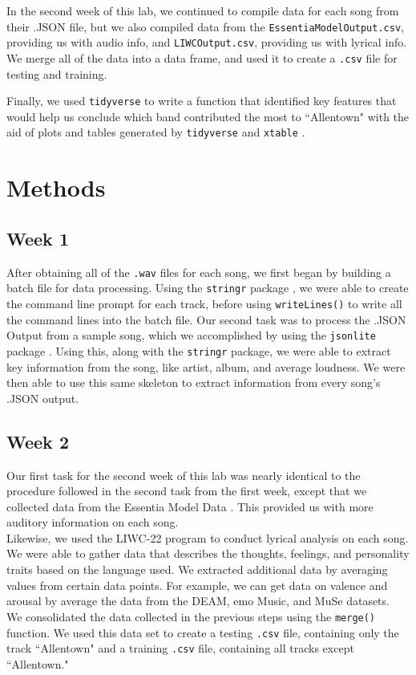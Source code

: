 \documentclass{article}\usepackage[]{graphicx}\usepackage[]{xcolor}
\begin{document}
\begin{multicols}{2}
\indent In the second week of this lab, we continued to compile data for each song from their .JSON file, but we also compiled data from the \texttt{EssentiaModelOutput.csv}, providing us with audio info, and \texttt{LIWCOutput.csv}, providing us with lyrical info. We merge all of the data into a data frame, and used it to create a \texttt{.csv} file for testing and training. 
\columnbreak

\indent Finally, we used \texttt{tidyverse} \citep{tidyverse} to write a function that identified key features that would help us conclude which band contributed the most to ``Allentown" with the aid of plots and tables generated by \texttt{tidyverse} and 
\texttt{xtable} \citep{xtable}.
\section{Methods}
\subsection{Week 1}
After obtaining all of the \texttt{.wav} files for each song, we first began by building a batch file for data processing. Using the \texttt{stringr} package \citep{stringr}, we were able to create the command line prompt for each track, before using \verb|writeLines()| to write all the command lines into the batch file.
Our second task was to process the .JSON Output from a sample song, which we accomplished by using the \texttt{jsonlite} package \citep{jsonlite}. Using this, along with the \texttt{stringr} package, we were able to extract key information from the song, like artist, album, and average loudness. We were then able to use this same skeleton to extract information from every song's .JSON output. 

\subsection{Week 2}
Our first task for the second week of this lab was nearly identical to the procedure followed in the second task from the first week, except that we collected data from the Essentia Model Data \citep{essentiamodel}. This provided us with more auditory information on each song. \\ 
\indent Likewise, we used the LIWC-22 program \citep{liwc} to conduct lyrical analysis on each song. We were able to gather data that describes the thoughts, feelings, and personality traits based on the language used. We extracted additional data by averaging values from certain data points. For example, we can get data on valence and arousal by average the data from the DEAM, emo Music, and MuSe datasets. \\ 
\indent We consolidated the data collected in the previous steps using the \verb|merge()| function. We used this data set to create a testing \texttt{.csv} file, containing only the track ``Allentown" and a training \texttt{.csv} file, containing all tracks except ``Allentown."

\end{multicols}
\end{document}
